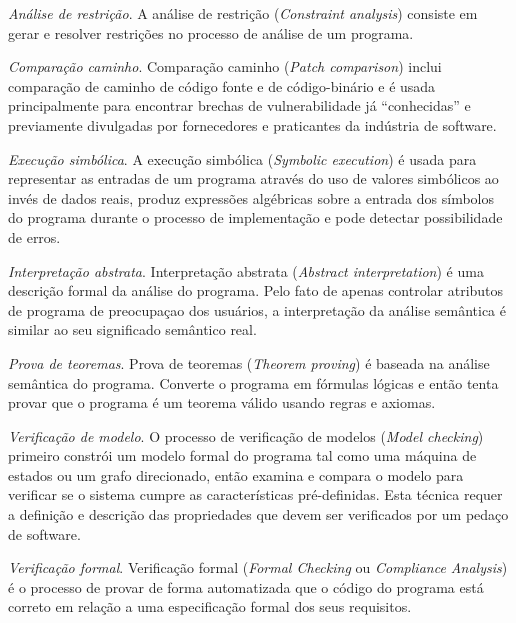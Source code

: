 \begin{description}
  \item \textit{Análise de restrição}.
    A análise de restrição ({\it Constraint analysis}) consiste em gerar
    e resolver restrições no processo de análise de um programa.

  \item \textit{Comparação caminho}.
    Comparação caminho ({\it Patch comparison}) inclui comparação de caminho de
    código fonte e de código-binário e é usada principalmente para encontrar
    brechas de vulnerabilidade já ``conhecidas'' e previamente divulgadas por
    fornecedores e praticantes da indústria de software.

  \item \textit{Execução simbólica}.
    A execução simbólica ({\it Symbolic execution}) é usada para representar
    as entradas de um programa através do uso de valores simbólicos ao invés
    de dados reais, produz expressões algébricas sobre a entrada dos símbolos
    do programa durante o processo de implementação e pode detectar
    possibilidade de erros.

  \item \textit{Interpretação abstrata}.
    Interpretação abstrata ({\it Abstract interpretation}) é uma descrição
    formal da análise do programa. Pelo fato de apenas controlar atributos de
    programa de preocupaçao dos usuários, a interpretação da análise semântica
    é similar ao seu significado semântico real.

  \item \textit{Prova de teoremas}.
    Prova de teoremas ({\it Theorem proving}) é baseada na análise semântica do
    programa. Converte o programa em fórmulas lógicas e então tenta provar que
    o programa é um teorema válido usando regras e axiomas.

  \item \textit{Verificação de modelo}.
    O processo de verificação de modelos ({\it Model checking}) primeiro constrói
    um modelo formal do programa tal como uma máquina de estados ou um grafo
    direcionado, então examina e compara o modelo para verificar se o sistema
    cumpre as características pré-definidas. Esta técnica requer a definição e
    descrição das propriedades que devem ser verificados por um pedaço de
    software.

  \item \textit{Verificação formal}.
    Verificação formal ({\it Formal Checking} ou {\it Compliance Analysis}) é o
    processo de provar de forma automatizada que o código do programa está
    correto em relação a uma especificação formal dos seus requisitos.


\end{description}
